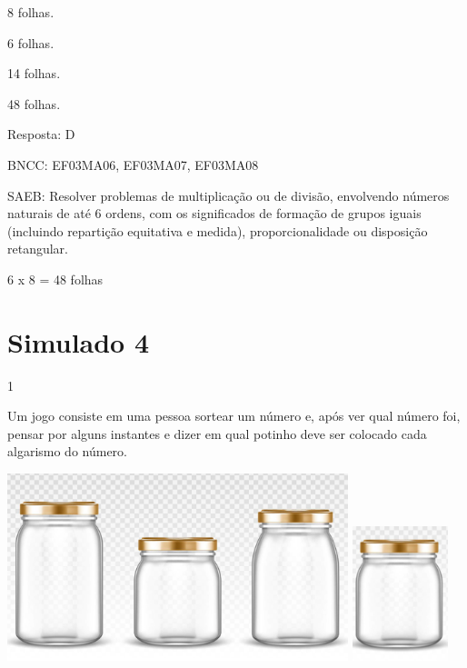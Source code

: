 \begin{escolha}
{\begin{escolha}
{\begin{escolha}

\item
  8 folhas.
\item
  6 folhas.
\item
  14 folhas.
\item
  48 folhas.
\end{escolha}

Resposta: D

BNCC: EF03MA06, EF03MA07, EF03MA08

SAEB: Resolver problemas de multiplicação ou de divisão,
envolvendo números naturais de até 6 ordens, com os significados de
formação de grupos iguais (incluindo repartição equitativa e medida),
proporcionalidade ou disposição retangular.

6 x 8 = 48 folhas

\chapter{Simulado 4}

\num{1}

Um jogo consiste em uma pessoa sortear um número e, após ver qual número
foi, pensar por alguns instantes e dizer em qual potinho deve ser
colocado cada algarismo do número.

\includegraphics[width=3.90833in,height=2.14168in]{media/image129.png}
\includegraphics[width=1.10010in,height=1.54180in]{media/image130.png}


}
\end{escolha}}
\end{escolha}
